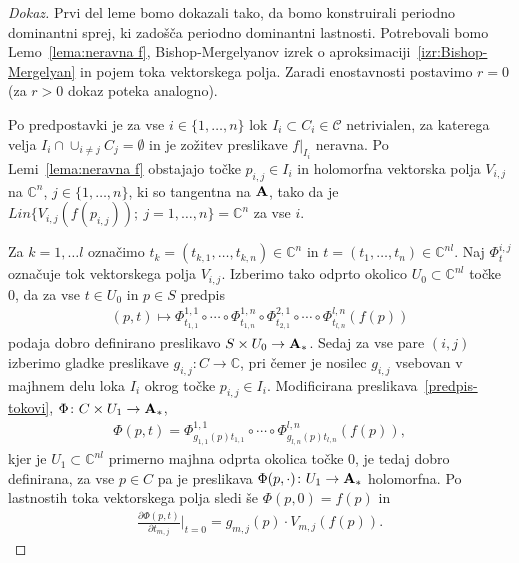 \documentclass[12pt,a4paper,twoside]{article}
\theoremstyle{definition} %
\newenvironment{dokaz}[1][Dokaz]{\begin{proof}[#1]}{\end{proof}}
\theoremstyle{plain} %
\numberwithin{equation}{section}  %
\newcommand{\C}{\mathbb C}
\begin{document}
\begin{dokaz}
Prvi del leme bomo dokazali tako, da bomo konstruirali periodno dominantni sprej, ki zadošča periodno dominantni lastnosti. Potrebovali bomo Lemo~\ref{lema:neravna f}, Bishop-Mergelyanov izrek o aproksimaciji~\ref{izr:Bishop-Mergelyan} in pojem toka vektorskega polja.
Zaradi enostavnosti postavimo $r=0$ (za $r>0$ dokaz poteka analogno).

Po predpostavki je za vse $i \in \{ 1, \dots, n \}$ lok $I_{i} \subset C_{i} \in \mathcal{C}$ netrivialen, za katerega velja $I_{i} \cap \cup_{i \neq j} C_{j} = \emptyset$ in je zožitev preslikave $f|_{I_{i}}$ neravna. Po Lemi~\ref{lema:neravna f} obstajajo točke $p_{i,j} \in I_{i}$ in holomorfna vektorska polja $V_{i,j}$ na $\C^{n}$, $j \in \{1, \dots, n \}$, ki so tangentna na $\textbf{\textup{A}}$, tako da je $Lin \{ V_{i,j}(f(p_{i,j})) ; \ j = 1, \dots, n \} = \C^{n}$ za vse $i$.

Za $k = 1, \dots l$ označimo $t_{k} = (t_{k,1}, \dots, t_{k,n}) \in \C^{n}$ in $t = (t_{1}, \dots, t_{n}) \in \C^{nl}$. Naj $\Phi_{t}^{i,j}$ označuje tok vektorskega polja $V_{i,j}$.
Izberimo tako odprto okolico $U_{0} \subset \C^{nl}$ točke $0$, da za vse $t \in U_{0}$ in $p \in S$ predpis
\begin{align} \label{predpis-tokovi}
(p, t) \mapsto \Phi_{t_{1,1}}^{1,1} \circ \cdots \circ \Phi_{t_{1,n}}^{1,n} \circ \Phi_{t_{2,1}}^{2,1} \circ \cdots \circ \Phi_{t_{l,n}}^{l,n} (f(p))
\end{align}
podaja dobro definirano preslikavo $S \times U_{0} \to \textbf{\textup{A}}_{*}$.
Sedaj za vse pare $(i,j)$ izberimo gladke preslikave $g_{i,j} \colon C \to \C$, pri čemer je nosilec $g_{i,j}$ vsebovan v majhnem delu loka $I_{i}$ okrog točke $p_{i,j} \in I_{i}$.
Modificirana preslikava~\ref{predpis-tokovi}, $\Phi \colon C \times U_{1} \to \textbf{\textup{A}}_{*}$,
\begin{align} \label{predpis-Phi}
\Phi(p,t) = \Phi_{g_{1,1}(p)t_{1,1}}^{1,1} \circ \cdots \circ \Phi_{g_{l,n}(p)t_{l,n}}^{l,n} (f(p)),
\end{align}
kjer je $U_{1} \subset \C^{nl}$ primerno majhna odprta okolica točke $0$, je tedaj dobro definirana, za vse $p \in C$ pa je preslikava $\Phi(p, \cdot) \colon U_{1} \to \textbf{\textup{A}}_{*}$ holomorfna. Po lastnostih toka vektorskega polja sledi še $\Phi(p,0) = f(p)$ in
\begin{align} \label{dPhi/dt}
\frac{\partial \Phi(p,t)}{\partial t_{m,j}} \Big|_{t=0} = g_{m,j}(p) \cdot V_{m,j}(f(p)).
\end{align}


\end{dokaz}
\end{document}
